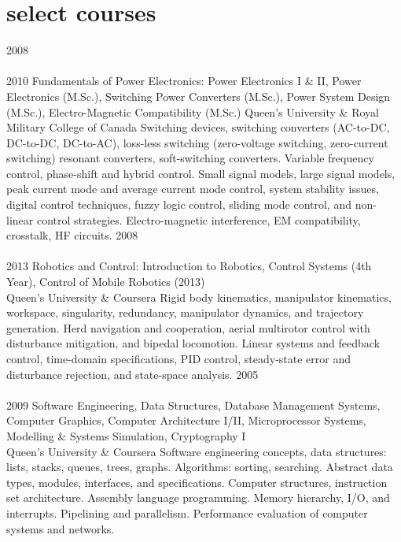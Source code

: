
\section{select courses}

\begin{entrylist}
\entry
  {2008\\\faChevronDown\\2010}
  {Fundamentals of Power Electronics: Power Electronics I \& II, Power Electronics (M.Sc.), Switching Power Converters (M.Sc.), Power System Design (M.Sc.), Electro-Magnetic Compatibility (M.Sc.)}
  {Queen's University \& Royal Military College of Canada}
  {Switching devices, switching converters (AC-to-DC, DC-to-DC, DC-to-AC), 
  loss-less switching (zero-voltage switching, zero-current switching) resonant converters, soft-switching converters. 
  Variable frequency control, phase-shift and hybrid control. Small signal 
  models, large signal models, peak current mode and average current mode control, system stability issues, 
  digital control techniques, fuzzy logic control, sliding mode control, and non-linear control strategies. 
  Electro-magnetic interference, EM compatibility, crosstalk, HF circuits.}
\entry
  {2008\\\faChevronDown\\2013}
  {Robotics and Control: Introduction to Robotics, Control Systems (4th Year), Control of Mobile Robotics (2013)}
  {\\Queen's University \& Coursera}
  {Rigid body kinematics, manipulator kinematics, workspace, singularity, redundancy, 
  manipulator dynamics, and trajectory generation. Herd navigation and cooperation, aerial multirotor control with disturbance
  mitigation, and bipedal locomotion. Linear systems and feedback control, time-domain specifications, 
  PID control, steady-state error and disturbance rejection, and state-space analysis.}
\entry
  {2005\\\faChevronDown\\2009}
  {Software Engineering, Data Structures, Database Management Systems, Computer Graphics, Computer Architecture I/II, Microprocessor Systems, Modelling \& Systems Simulation, Cryptography I}
  {\\Queen's University \& Coursera}
  {Software engineering concepts, data structures: lists, stacks, queues, trees, graphs. Algorithms: sorting, searching. Abstract data types, modules, interfaces, and specifications.
  Computer structures, instruction set architecture. Assembly language programming. Memory hierarchy, I/O, and interrupts. Pipelining and parallelism.
  Performance evaluation of computer systems and networks.}
\end{entrylist}